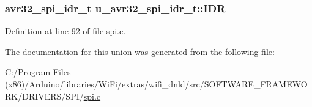\subsubsection[{I\+D\+R}]{\setlength{\rightskip}{0pt plus 5cm}avr32\+\_\+spi\+\_\+idr\+\_\+t u\+\_\+avr32\+\_\+spi\+\_\+idr\+\_\+t\+::\+I\+D\+R}\label{unionu__avr32__spi__idr__t_a06ada7c165b785398d24060fc7585668}


Definition at line 92 of file spi.\+c.



The documentation for this union was generated from the following file\+:\begin{DoxyCompactItemize}
\item 
C\+:/\+Program Files (x86)/\+Arduino/libraries/\+Wi\+Fi/extras/wifi\+\_\+dnld/src/\+S\+O\+F\+T\+W\+A\+R\+E\+\_\+\+F\+R\+A\+M\+E\+W\+O\+R\+K/\+D\+R\+I\+V\+E\+R\+S/\+S\+P\+I/\hyperlink{spi_8c}{spi.\+c}\end{DoxyCompactItemize}
